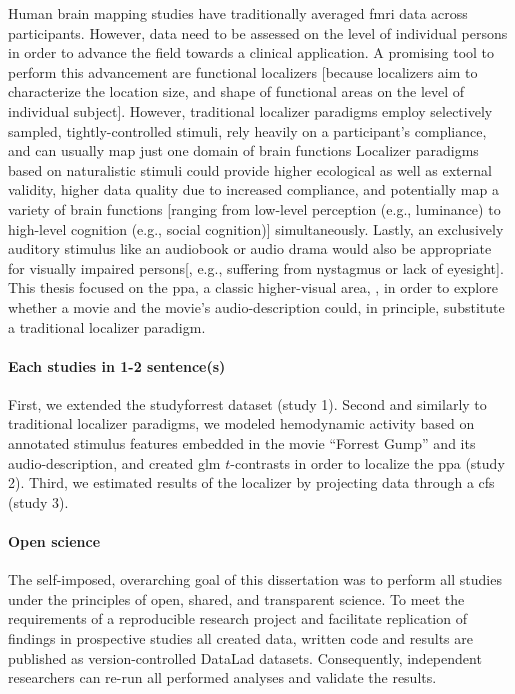 
Human brain mapping studies have traditionally averaged \ac{fmri} data across
participants.
%
However, data need to be assessed on the level of individual persons in order to
advance the field towards a clinical application.
A promising tool to perform this advancement are functional localizers [because
localizers aim to characterize the location size, and shape of functional areas
on the level of individual subject].
However, traditional localizer paradigms employ selectively sampled,
tightly-controlled stimuli, rely heavily on a participant's compliance, and can
usually map just one domain of brain functions
Localizer paradigms based on naturalistic stimuli could provide higher
ecological as well as external validity, higher data quality due to increased
compliance, and potentially map a variety of brain functions [ranging from
low-level perception (e.g., luminance) to high-level cognition (e.g., social
cognition)] simultaneously.
Lastly, an exclusively auditory stimulus like an audiobook or audio drama would
also be appropriate for visually impaired persons[, e.g., suffering from
nystagmus or lack of eyesight].
This thesis focused on the \ac{ppa}, a classic higher-visual area,
\citep{epstein1998ppa}, in order to explore whether a movie and the movie's
audio-description could, in principle, substitute a traditional localizer
paradigm.

\paragraph{Each studies in 1-2 sentence(s)}

%
First, we extended the studyforrest dataset (study 1).
%
Second and similarly to traditional localizer paradigms, we modeled hemodynamic
activity based on annotated stimulus features embedded in the movie ``Forrest
Gump'' and its audio-description, and created \ac{glm} $t$-contrasts in order to
localize the \ac{ppa} (study 2).
%
Third, we estimated results of the localizer by projecting data through a
\ac{cfs} (study 3).


\paragraph{Open science}
The self-imposed, overarching goal of this dissertation was to perform all
studies under the principles of open, shared, and transparent science.
To meet the requirements of a reproducible research project and facilitate
replication of findings in prospective studies all created data, written code
and results are published as version-controlled DataLad
\citep[\href{www.datalad.org}{datalad.org};][]{halchenko2021datalad} datasets.
Consequently, independent researchers can re-run all performed analyses and
validate the results.


